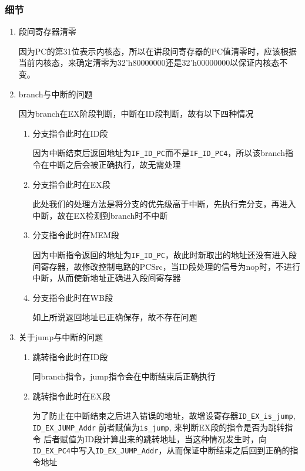 \documentclass{ctexart}
\begin{document}
\begin{enumerate}
	\subsubsection{细节}
\begin{enumerate}
\item 段间寄存器清零

因为PC的第31位表示内核态，所以在讲段间寄存器的PC值清零时，应该根据当前内核态，来确定清零为32’h80000000还是32’h00000000以保证内核态不变。

\item branch与中断的问题

因为branch在EX阶段判断，中断在ID段判断，故有以下四种情况

\begin{enumerate}
\item 分支指令此时在ID段

因为中断结束后返回地址为\verb"IF_ID_PC"而不是\verb"IF_ID_PC4"，所以该branch指令在中断之后会被正确执行，故无需处理

\item 分支指令此时在EX段

此处我们的处理方法是将分支的优先级高于中断，先执行完分支，再进入中断，故在EX检测到branch时不中断

\item 分支指令此时在MEM段

因为中断指令返回的地址为\verb"IF_ID_PC"，故此时新取出的地址还没有进入段间寄存器，故修改控制电路的PCSrc，当ID段处理的信号为nop时，不进行中断，从而使新地址正确进入段间寄存器

\item 分支指令此时在WB段

如上所说返回地址已正确保存，故不存在问题
\end{enumerate}

\item 关于jump与中断的问题

\begin{enumerate}
\item 跳转指令此时在ID段

同branch指令，jump指令会在中断结束后正确执行

\item 跳转指令此时在EX段

为了防止在中断结束之后进入错误的地址，故增设寄存器\verb"ID_EX_is_jump", \verb"ID_EX_JUMP_Addr"
前者赋值为\verb"is_jump", 来判断EX段的指令是否为跳转指令
后者赋值为ID段计算出来的跳转地址，当这种情况发生时，向\verb"ID_EX_PC4"中写入\verb"ID_EX_JUMP_Addr"，从而保证中断结束之后回到正确的指令地址


\end{enumerate}
\end{enumerate}
\end{enumerate}
\end{document}
